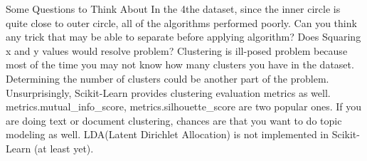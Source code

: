 Some Questions to Think About
In the 4the dataset, since the inner circle is quite close to outer circle, all of the algorithms performed poorly. Can you think any trick that may be able to separate before applying algorithm? Does Squaring x and y values would resolve problem?
Clustering is ill-posed problem because most of the time you may not know how many clusters you have in the dataset. Determining the number of clusters could be another part of the problem. Unsurprisingly, Scikit-Learn provides clustering evaluation metrics as well. metrics.mutual_info_score, metrics.silhouette_score are two popular ones.
If you are doing text or document clustering, chances are that you want to do topic modeling as well. LDA(Latent Dirichlet Allocation) is not implemented in Scikit-Learn (at least yet).
